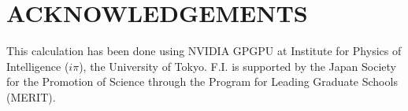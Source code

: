 \section*{ACKNOWLEDGEMENTS}
This calculation has been done using NVIDIA GPGPU at Institute for Physics of Intelligence ($i\pi$), the University of Tokyo.
F.I. is supported by the Japan Society for the Promotion of Science through the Program for Leading Graduate Schools (MERIT).
